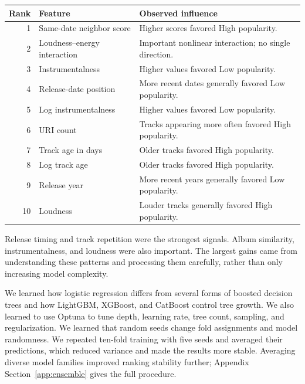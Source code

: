 \documentclass{article}
\begin{document}
\begin{center}
\footnotesize
\setlength{\tabcolsep}{6pt}
\renewcommand{\arraystretch}{1.05}
\begin{tabularx}{0.92\textwidth}{@{}r
  >{\raggedright\arraybackslash}p{}
  >{\raggedright\arraybackslash}X@{}}
\toprule
\textbf{Rank} & \textbf{Feature} & \textbf{Observed influence} \\
\midrule
1 & Same-date neighbor score & Higher scores favored High popularity. \\
2 & Loudness--energy interaction & Important nonlinear interaction; no single direction. \\
3 & Instrumentalness & Higher values favored Low popularity. \\
4 & Release-date position & More recent dates generally favored Low popularity. \\
5 & Log instrumentalness & Higher values favored Low popularity. \\
6 & URI count & Tracks appearing more often favored High popularity. \\
7 & Track age in days & Older tracks favored High popularity. \\
8 & Log track age & Older tracks favored High popularity. \\
9 & Release year & More recent years generally favored Low popularity. \\
10 & Loudness & Louder tracks generally favored High popularity. \\
\bottomrule
\end{tabularx}
\end{center}

Release timing and track repetition were the strongest signals. Album
similarity, instrumentalness, and loudness were also important. The largest
gains came from understanding these patterns and processing them carefully,
rather than only increasing model complexity.

We learned how logistic regression differs from several forms of boosted
decision trees and how LightGBM, XGBoost, and CatBoost control tree growth.
We also learned to use Optuna to tune depth, learning rate, tree count,
sampling, and regularization. We learned that random seeds change fold
assignments and model randomness. We repeated ten-fold training with five
seeds and averaged their predictions, which reduced variance and made the
results more stable. Averaging diverse model families improved ranking
stability further; Appendix Section~\ref{app:ensemble} gives the full
procedure.
\end{document}
